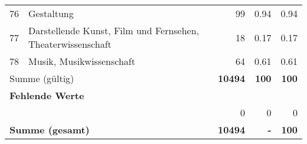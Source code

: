 \begin{longtable}{lXrrr}
        76 & \multicolumn{1}{X}{Gestaltung} & %
          \num{99} &
          \num[round-mode=places,round-precision=2]{0.94} &
          \num[round-mode=places,round-precision=2]{0.94} \\

        77 & \multicolumn{1}{X}{Darstellende Kunst, Film und Fernsehen, Theaterwissenschaft} & %
          \num{18} &
          \num[round-mode=places,round-precision=2]{0.17} &
          \num[round-mode=places,round-precision=2]{0.17} \\

        78 & \multicolumn{1}{X}{Musik, Musikwissenschaft} & %
          \num{64} &
          \num[round-mode=places,round-precision=2]{0.61} &
          \num[round-mode=places,round-precision=2]{0.61} \\

     \midrule
     \multicolumn{2}{l}{Summe (gültig)} &
       \textbf{\num{10494}} &
     \textbf{\num{100}} &
       \textbf{\num[round-mode=places,round-precision=2]{100}} \\
     \multicolumn{5}{l}{\textbf{Fehlende Werte}}\\
      & & 0 & 0 & 0 \\
     \midrule
     \multicolumn{2}{l}{\textbf{Summe (gesamt)}} &
          \textbf{\num{10494}} &
        \textbf{-} &
        \textbf{\num{100}} \\
     \bottomrule
     \end{longtable}
     
